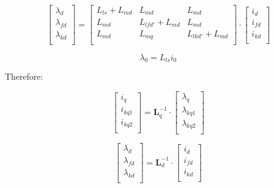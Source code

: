 \begin{equation}
  \begin{bmatrix}
    \lambda_{d} \\
    \lambda_{fd} \\
    \lambda_{kd} \\
  \end{bmatrix}
=
  \begin{bmatrix}
	L_{ls} + L_{md} & L_{md} & L_{md} \\
	L_{md} & L_{lfd'} + L_{md} & L_{md} \\
	L_{md} & L_{mq} & L_{lkd'} + L_{md} \\
  \end{bmatrix}
\cdot
  \begin{bmatrix}
    i_{d} \\
    i_{fd} \\
    i_{kd} \\
  \end{bmatrix}
\end{equation}

\begin{equation}
  \lambda_{0} = L_{ls} i_0
\end{equation}

Therefore:

\begin{equation}
  \begin{bmatrix}
    i_{q} \\
    i_{kq1} \\
    i_{kq2} \\
  \end{bmatrix}
=
\mathbf{L}_q^{-1}
\cdot
  \begin{bmatrix}
    \lambda_{q} \\
    \lambda_{kq1} \\
    \lambda_{kq2} \\
  \end{bmatrix}
\end{equation}

\begin{equation}
  \begin{bmatrix}
    \lambda_{d} \\
    \lambda_{fd} \\
    \lambda_{kd} \\
  \end{bmatrix}
=
\mathbf{L}_d^{-1}
\cdot
  \begin{bmatrix}
    i_{d} \\
    i_{fd} \\
    i_{kd} \\
  \end{bmatrix}
\end{equation}


